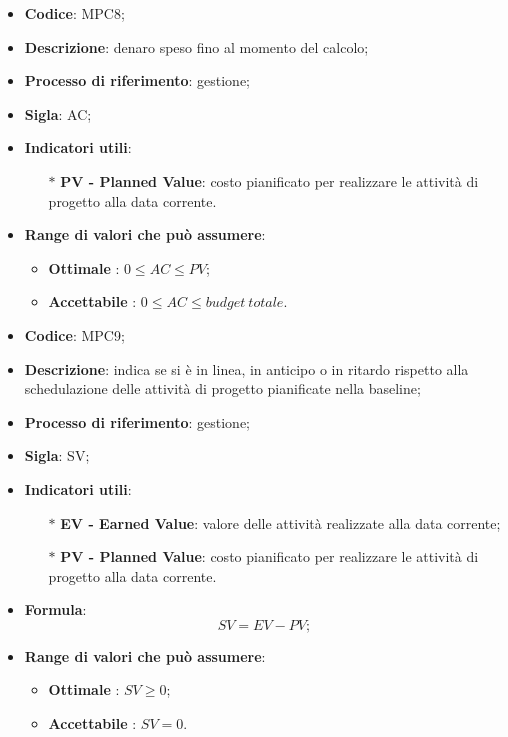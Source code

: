 \vspace{-1cm}
\begin{itemize}
	\item \textbf{Codice}: MPC8;
	\item \textbf{Descrizione}: denaro speso fino al momento del calcolo;
	\item \textbf{Processo di riferimento}: gestione;
	\item \textbf{Sigla}: AC;
	\item \textbf{Indicatori utili}: 
		\begin{itemize}
			\item[$\ast$] \textbf{PV - Planned Value}: costo pianificato per realizzare le attività di progetto alla data corrente.
		\end{itemize}
	\item \textbf{Range di valori che può assumere}: 
		\begin{itemize}
			\item \textbf{Ottimale} : $0 \leq AC \leq PV $;
			\item \textbf{Accettabile} : $0 \leq AC \leq budget \ totale $.
		\end{itemize}
\end{itemize}
\vspace{-1cm}
\begin{itemize}
	\item \textbf{Codice}: MPC9;
	\item \textbf{Descrizione}: indica se si è in linea, in anticipo o in ritardo rispetto alla schedulazione delle attività di progetto pianificate nella baseline;
	\item \textbf{Processo di riferimento}: gestione;
	\item \textbf{Sigla}: SV;
	\item \textbf{Indicatori utili}: 
		\begin{itemize}
		\item[$\ast$] \textbf{EV - Earned Value}: valore delle attività realizzate alla data corrente;
		\item[$\ast$] \textbf{PV - Planned Value}: costo pianificato per realizzare le attività di progetto alla data corrente.
		\end{itemize}
	\item \textbf{Formula}: \[ SV = EV - PV; \]
	\item \textbf{Range di valori che può assumere}: 
		\begin{itemize}
			\item \textbf{Ottimale} : $SV \geq 0$;
			\item \textbf{Accettabile} : $SV = 0$.
		\end{itemize}
\end{itemize}
